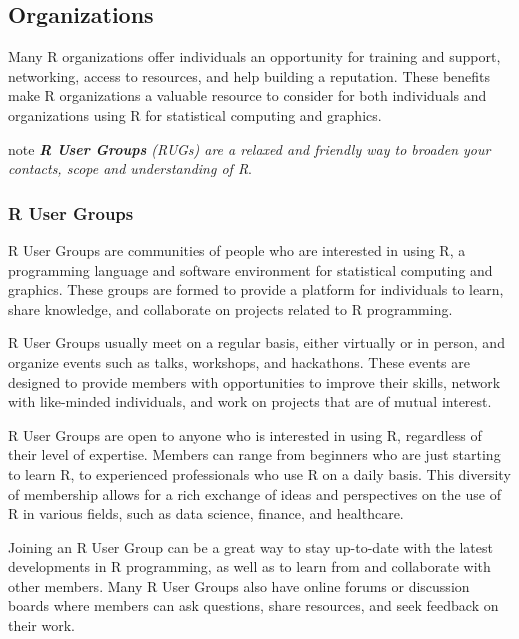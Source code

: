 \documentclass[
]{book}
\begin{document}
\hypertarget{organizations}{%
\subsection*{Organizations}\label{organizations}}

Many R organizations offer individuals an opportunity for training and support, networking, access to resources, and help building a reputation. These benefits make R organizations a valuable resource to consider for both individuals and organizations using R for statistical computing and graphics.

\begin{infobox}{note}
\emph{\textbf{R User Groups} (RUGs) are a relaxed and friendly way to broaden your contacts, scope and understanding of R}.

\end{infobox}

\hypertarget{r-user-groups}{%
\subsubsection*{R User Groups}\label{r-user-groups}}

R User Groups are communities of people who are interested in using R, a programming language and software environment for statistical computing and graphics. These groups are formed to provide a platform for individuals to learn, share knowledge, and collaborate on projects related to R programming.

R User Groups usually meet on a regular basis, either virtually or in person, and organize events such as talks, workshops, and hackathons. These events are designed to provide members with opportunities to improve their skills, network with like-minded individuals, and work on projects that are of mutual interest.

R User Groups are open to anyone who is interested in using R, regardless of their level of expertise. Members can range from beginners who are just starting to learn R, to experienced professionals who use R on a daily basis. This diversity of membership allows for a rich exchange of ideas and perspectives on the use of R in various fields, such as data science, finance, and healthcare.

Joining an R User Group can be a great way to stay up-to-date with the latest developments in R programming, as well as to learn from and collaborate with other members. Many R User Groups also have online forums or discussion boards where members can ask questions, share resources, and seek feedback on their work.
\end{document}
